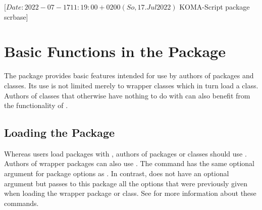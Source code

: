 %
%
%
%
%
%
%

                 [$Date: 2022-07-17 11:19:00 +0200 (So, 17. Jul 2022) $
                  KOMA-Script package scrbase]

\chapter{Basic Functions in the  Package}
\BeginIndexGroup
{}%

The  package provides basic features intended for use by
authors of packages and classes. Its use is not limited merely to wrapper
classes which in turn load a \KOMAScript{} class. Authors of classes that
otherwise have nothing to do with \KOMAScript{} can also benefit from the
functionality of .

\section{Loading the Package}

Whereas users load packages with , authors of packages or
classes should use . Authors of
wrapper packages can also use . The
 command has the same optional argument for package
options as . In contrast, 
does not have an optional argument but passes to this package all the options
that were previously given when loading the wrapper package or class. See
\cite{latex:clsguide} for more information about these commands.

